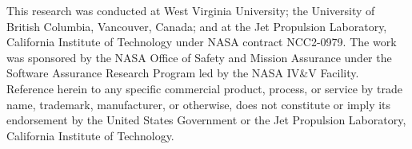 This research was conducted at West Virginia University;
the University of British Columbia, Vancouver, Canada; and at the Jet
Propulsion Laboratory, California Institute of Technology under NASA
contract NCC2-0979. The work was sponsored by the NASA Office of
Safety and Mission Assurance under the Software Assurance Research
Program led by the NASA IV\&V Facility.  Reference herein to any
specific commercial product, process, or service by trade name,
trademark, manufacturer, or otherwise, does not constitute or imply
its endorsement by the United States Government or the Jet Propulsion
Laboratory, California Institute of Technology.